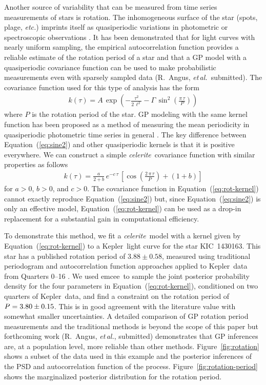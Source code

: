 \documentclass[manuscript, letterpaper]{aastex6}
\newcommand{\project}[1]{\textsf{#1}}
\newcommand{\kepler}{\project{Kepler}}
\newcommand{\celeriteterm}{\emph{celerite}}
\newcommand{\emcee}{\project{emcee}}
\newcommand{\foreign}[1]{\emph{#1}}
\newcommand{\etal}{\foreign{et\,al.}}
\newcommand{\etc}{\foreign{etc.}}
\newcommand{\figureref}[1]{\ref{fig:#1}}
\newcommand{\Figure}[1]{Figure~\figureref{#1}}
\renewcommand{\eqref}[1]{\ref{eq:#1}}
\newcommand{\Eq}[1]{Equation~(\eqref{#1})}
\newcommand{\eq}[1]{\Eq{#1}}
\newcommand{\eqlabel}[1]{\label{eq:#1}}
\begin{document}
Another source of variability that can be measured from time series
measurements of stars is rotation.
The inhomogeneous surface of the star (spots, plage, \etc) imprints itself as
quasiperiodic variations in photometric or spectroscopic observations
\citep{Dumusque:2014}.
It has been demonstrated that for light curves with nearly uniform sampling,
the empirical autocorrelation function provides a reliable estimate of the
rotation period of a star \citep{Mcquillan:2013, Mcquillan:2014, Aigrain:2015}
and that a GP model with a
quasiperiodic covariance function can be used to make probabilistic
measurements even with sparsely sampled data (R.~Angus, \etal\ submitted).
The covariance function used for this type of analysis has the form
\begin{eqnarray}\eqlabel{sine2}
k(\tau) = A\,\exp\left(-\frac{\tau^2}{2\,\ell^2} -
    \Gamma\,\sin^2\left(\frac{\pi\,\tau}{P} \right) \right)
\end{eqnarray}
where $P$ is the rotation period of the star.
GP modeling with the same kernel function has been proposed as a method of
measuring the mean periodicity in quasiperiodic photometric time series in
general \citep{Wang:2012}.
The key difference between \eq{sine2} and other quasiperiodic kernels is that
it is positive everywhere.
We can construct a simple \celeriteterm\ covariance function with similar properties
as follows
\begin{eqnarray}\eqlabel{rot-kernel}
k(\tau) = \frac{a}{2+b}\,e^{-c\,\tau}\,\left[
    \cos\left(\frac{2\,\pi\,\tau}{P}\right) + (1 + b)
\right]
\end{eqnarray}
for $a>0$, $b>0$, and $c>0$.
The covariance function in \eq{rot-kernel} cannot exactly reproduce \eq{sine2}
but, since \eq{sine2} is only an effective model, \eq{rot-kernel} can be used
as a drop-in replacement for a substantial gain in computational efficiency.

To demonstrate this method, we fit a \celeriteterm\ model with a kernel given by
\eq{rot-kernel} to a \kepler\ light curve for the star KIC~1430163.
This star has a published rotation period of $3.88 \pm 0.58$, measured using
traditional periodogram and autocorrelation function approaches applied to
\kepler\ data from Quarters 0--16 \citep{Mathur:2014}.
We used \emcee\ to sample the joint posterior probability density for the four
parameters in \eq{rot-kernel}, conditioned on two quarters of \kepler\ data,
and find a constraint on the rotation period of $P = {3.80 \pm 0.15}$.
This is in good agreement with the literature value with somewhat smaller
uncertainties.
A detailed comparison of GP rotation period measurements and the traditional
methods is beyond the scope of this paper but forthcoming work (R.~Angus,
\etal, submitted) demonstrates that GP inferences are, at a population level,
more reliable than other methods.
\Figure{rotation} shows a subset of the data used in this example and the
posterior inferences of the PSD and autocorrelation function of the process.
\Figure{rotation-period} shows the marginalized posterior distribution for the
rotation period.
\end{document}
